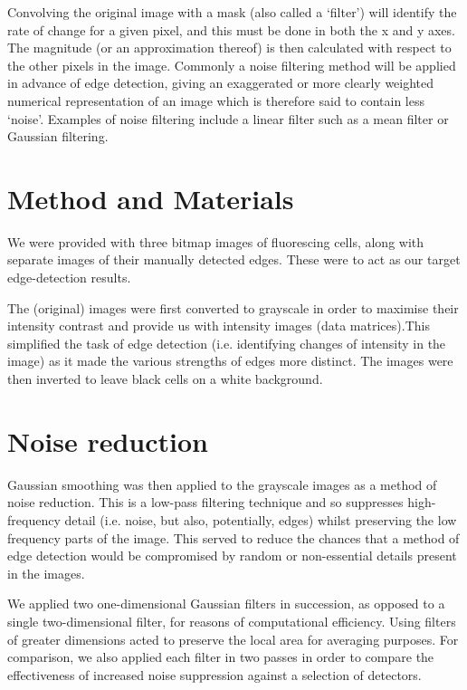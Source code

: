\documentclass[a4paper]{article}
\begin{document}
\begin{multicols*}{2}
Convolving the original image with a mask (also called a ‘filter’) will identify the rate of change for a given pixel, and this must be done in both the x and y axes. The magnitude (or an approximation thereof) is then calculated with respect to the other pixels in the image. Commonly a noise filtering method will be applied in advance of edge detection, giving an exaggerated or more clearly weighted numerical representation of an image which is therefore said to contain less ‘noise’. Examples of noise filtering include a linear filter such as a mean filter or Gaussian filtering.

\section*{Method and Materials}

We were provided with three bitmap images of fluorescing cells, along with separate images of their manually detected edges. These were to act as our target edge-detection results.

The (original) images were first converted to grayscale in order to maximise their intensity contrast and provide us with intensity images (data matrices).This simplified the task of edge detection (i.e. identifying changes of intensity in the image) as it made the various strengths of edges more distinct. The images were then inverted to leave black cells on a white background. 

\section*{Noise reduction}

Gaussian smoothing was then applied to the grayscale images as a method of noise reduction. This is a low-pass filtering technique and so suppresses high-frequency detail (i.e. noise, but also, potentially, edges) whilst preserving the low frequency parts of the image. This served to reduce the chances that a method of edge detection would be compromised by random or non-essential details present in the images.

We applied two one-dimensional Gaussian filters in succession, as opposed to a single two-dimensional filter, for reasons of computational efficiency. Using filters of greater dimensions acted to preserve the local area for averaging purposes. For comparison, we also applied each filter in two passes in order to compare the effectiveness of increased noise suppression against a selection of detectors.


\end{multicols*}
\end{document}
